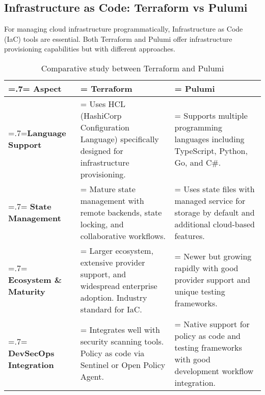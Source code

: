 \subsection{Infrastructure as Code: Terraform vs Pulumi}
For managing cloud infrastructure programmatically, Infrastructure as Code (IaC) tools are essential. Both Terraform and Pulumi offer infrastructure provisioning capabilities but with different approaches.

\begin{table}[H]
    \renewcommand{\arraystretch}{1.5}%
    \caption{Comparative study between Terraform and Pulumi}
    \centering
    \medskip
    \begin{tabularx}{1\textwidth} {
            | >{\hsize=.7\hsize\linewidth=\hsize\centering\arraybackslash}X
            | >{\hsize=1.15\hsize\linewidth=\hsize\justifying\arraybackslash}X
            | >{\hsize=1.15\hsize\linewidth=\hsize\justifying\arraybackslash}X |}
        \hline
        \rowcolor{primary} \textbf {Aspect} & \textbf {Terraform}                                                                                                    & \textbf {Pulumi}                                                                                               \\
        \hline
        \textbf {Language Support}          & \noindent Uses HCL (HashiCorp Configuration Language) specifically designed for infrastructure provisioning.           & \noindent Supports multiple programming languages including TypeScript, Python, Go, and C\#.                   \\
        \hline
        \textbf {State Management}          & \noindent Mature state management with remote backends, state locking, and collaborative workflows.                    & \noindent Uses state files with managed service for storage by default and additional cloud-based features.    \\
        \hline
        \textbf {Ecosystem \& Maturity}     & \noindent Larger ecosystem, extensive provider support, and widespread enterprise adoption. Industry standard for IaC. & \noindent Newer but growing rapidly with good provider support and unique testing frameworks.                  \\
        \hline
        \textbf {DevSecOps Integration}     & \noindent Integrates well with security scanning tools. Policy as code via Sentinel or Open Policy Agent.              & \noindent Native support for policy as code and testing frameworks with good development workflow integration. \\
        \hline
    \end{tabularx}
\end{table}

